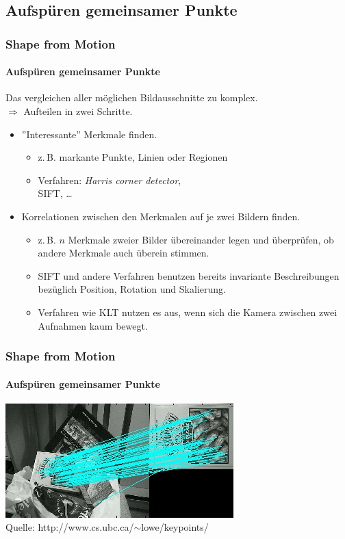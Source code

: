 \documentclass{beamer}
\begin{document}
\subsection{Aufspüren gemeinsamer Punkte}
\begin{frame}
	\frametitle{Shape from Motion}
	\framesubtitle{Aufspüren gemeinsamer Punkte}
	
	Das vergleichen aller möglichen Bildausschnitte zu komplex. \pause \\
	$\Rightarrow$ Aufteilen in zwei Schritte.
	
	\begin{itemize}
		\item ''Interessante'' Merkmale finden.
			\begin{itemize}
				\item<3-> z.\,B. markante Punkte, Linien oder Regionen
				\item<3-> Verfahren: \emph{Harris corner detector}, \\
				\acf{SIFT}, \dots
			\end{itemize}
		\item Korrelationen zwischen den Merkmalen auf je zwei Bildern finden.
			\begin{itemize}
				\item<4-> z.\,B. $n$ Merkmale zweier Bilder übereinander legen und überprüfen, ob andere Merkmale auch überein stimmen.
				\item<4-> \ac{SIFT} und andere Verfahren benutzen bereits invariante Beschreibungen bezüglich Position, Rotation und Skalierung.
				\item<4-> Verfahren wie \ac{KLT} nutzen es aus, wenn sich die Kamera zwischen zwei Aufnahmen kaum bewegt.
			\end{itemize}
	\end{itemize}
\end{frame}


\begin{frame}
	\frametitle{Shape from Motion}
	\framesubtitle{Aufspüren gemeinsamer Punkte}
	
	\begin{center}
		\includegraphics[width=\linewidth]{includes/sift}\\
		Quelle: http://www.cs.ubc.ca/$\sim$lowe/keypoints/
	\end{center}
\end{frame}
\end{document}
